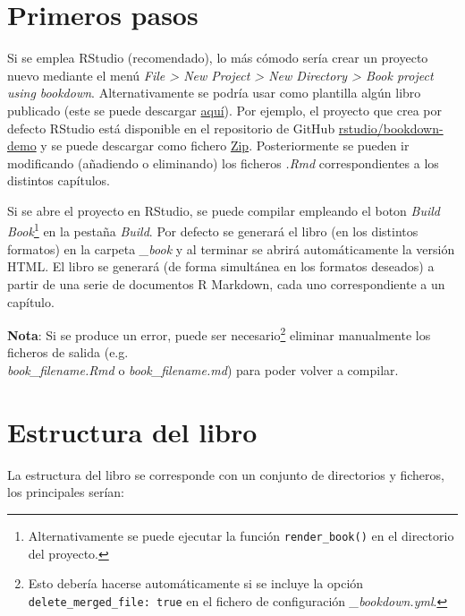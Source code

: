 \documentclass[]{book}
\let\rmarkdownfootnote\footnote%
\def\footnote{\protect\rmarkdownfootnote}
\theoremstyle{definition}
\theoremstyle{definition}
\theoremstyle{definition}
\theoremstyle{remark}
\begin{document}
\section{Primeros pasos}\label{primeros-pasos}

Si se emplea RStudio (recomendado), lo más cómodo sería crear un
proyecto nuevo mediante el menú \emph{File \textgreater{} New Project
\textgreater{} New Directory \textgreater{} Book project using
bookdown}. Alternativamente se podría usar como plantilla algún libro
publicado (este se puede descargar
\href{https://github.com/rubenfcasal/bookdown_intro/archive/master.zip}{aquí}).
Por ejemplo, el proyecto que crea por defecto RStudio está disponible en
el repositorio de GitHub
\href{https://github.com/rstudio/bookdown-demo}{rstudio/bookdown-demo} y
se puede descargar como fichero
\href{https://github.com/rstudio/bookdown-demo/archive/master.zip}{Zip}.
Posteriormente se pueden ir modificando (añadiendo o eliminando) los
ficheros \emph{.Rmd} correspondientes a los distintos capítulos.

Si se abre el proyecto en RStudio, se puede compilar empleando el boton
\emph{Build Book}\footnote{Alternativamente se puede ejecutar la función
  \texttt{render\_book()} en el directorio del proyecto.} en la pestaña
\emph{Build}. Por defecto se generará el libro (en los distintos
formatos) en la carpeta \emph{\_book} y al terminar se abrirá
automáticamente la versión HTML. El libro se generará (de forma
simultánea en los formatos deseados) a partir de una serie de documentos
R Markdown, cada uno correspondiente a un capítulo.

\textbf{Nota}: Si se produce un error, puede ser necesario\footnote{Esto
  debería hacerse automáticamente si se incluye la opción
  \texttt{delete\_merged\_file:\ true} en el fichero de configuración
  \emph{\_bookdown.yml}.} eliminar manualmente los ficheros de salida
(e.g.\\
\emph{book\_filename.Rmd} o \emph{book\_filename.md}) para poder volver
a compilar.

\section{Estructura del libro}\label{estructura-del-libro}

La estructura del libro se corresponde con un conjunto de directorios y
ficheros, los principales serían:
\end{document}
